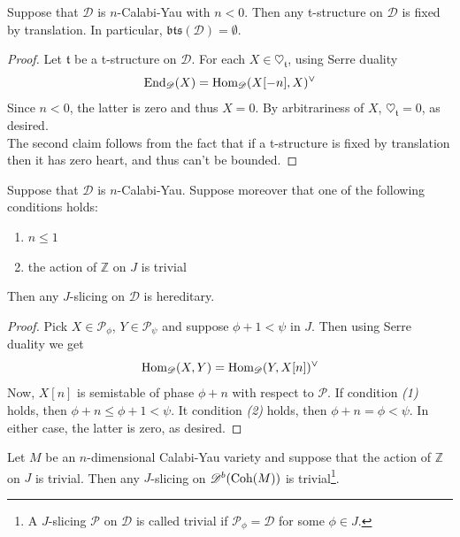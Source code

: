 \begin{prop}
Suppose that $\mathscr{D}$ is $n$-Calabi-Yau with $n<0$. Then any t-structure on $\mathscr{D}$ is fixed by translation. In particular, $\mathfrak{bts}(\mathscr{D})=\emptyset$. 
\end{prop}

\begin{proof}
Let $\mathfrak{t}$ be a t-structure on $\mathscr{D}$. For each $X \in \heartsuit_{\mathfrak{t}}$, using Serre duality  $$\textnormal{End}_{\mathscr{D}}(X)=\textnormal{Hom}_{\mathscr{D}}(X[-n],X)^{\vee}$$
Since $n<0$, the latter is zero and thus $X=0$. By arbitrariness of $X$, $\heartsuit_{\mathfrak{t}}=0$, as desired. \\
The second claim follows from the fact that if a t-structure is fixed by translation then it has zero heart, and thus can't be bounded. 
\end{proof}

\begin{prop}\label{tta}
Suppose that $\mathscr{D}$ is $n$-Calabi-Yau. Suppose moreover that one of the following conditions holds: 
\begin{enumerate} 
\item $n \le 1$ 
\item the action of $\mathbb{Z}$ on $J$ is trivial 
\end{enumerate}  
Then any $J$-slicing on $\mathscr{D}$ is hereditary. 
\end{prop}

\begin{proof}
Pick $X \in \mathscr{P}_{\phi}$, $Y \in \mathscr{P}_{\psi}$ and suppose $\phi + 1 < \psi$ in $J$. Then using Serre duality we get $$\textnormal{Hom}_{\mathscr{D}}(X,Y)=\textnormal{Hom}_{\mathscr{D}}(Y,X[n])^{\vee}$$
Now, $X[n]$ is semistable of phase $\phi + n $ with respect to $\mathscr{P}$. If condition \textit{(1)} holds, then $\phi + n \le \phi + 1 < \psi$. It condition \textit{(2)} holds, then $\phi + n = \phi < \psi$. In either case, the latter is zero, as desired. 
\end{proof}

\begin{prop}\label{ttb}
Let $M$ be an $n$-dimensional Calabi-Yau variety and suppose that the action of $\mathbb{Z}$ on $J$ is trivial. Then any $J$-slicing on $\mathscr{D}^b(\textnormal{Coh}(M))$ is trivial\footnote{A $J$-slicing $\mathscr{P}$ on $\mathscr{D}$ is called trivial if $\mathscr{P}_{\phi}=\mathscr{D}$ for some $\phi \in J$.}.
\end{prop}

